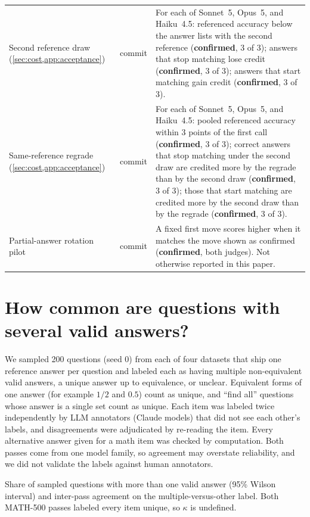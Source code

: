 {\begin{longtable}{L{3.2cm}L{1.1cm}L{8.7cm}}
Second reference draw (\cref{sec:cost,app:acceptance}) & commit & For each of Sonnet~5, Opus~5, and Haiku~4.5: referenced accuracy below the answer lists with the second reference (\textbf{confirmed}, 3 of 3); answers that stop matching lose credit (\textbf{confirmed}, 3 of 3); answers that start matching gain credit (\textbf{confirmed}, 3 of 3). \\
Same-reference regrade (\cref{sec:cost,app:acceptance}) & commit & For each of Sonnet~5, Opus~5, and Haiku~4.5: pooled referenced accuracy within 3 points of the first call (\textbf{confirmed}, 3 of 3); correct answers that stop matching under the second draw are credited more by the regrade than by the second draw (\textbf{confirmed}, 3 of 3); those that start matching are credited more by the second draw than by the regrade (\textbf{confirmed}, 3 of 3). \\
Partial-answer rotation pilot & commit & A fixed first move scores higher when it matches the move shown as confirmed (\textbf{confirmed}, both judges). Not otherwise reported in this paper. \\
\end{longtable}
}

\FloatBarrier
\section{How common are questions with several valid answers?}
\label{app:prevalence}

We sampled 200 questions (seed 0) from each of four datasets that ship one reference answer per question and labeled each as having multiple non-equivalent valid answers, a unique answer up to equivalence, or unclear. Equivalent forms of one answer (for example $1/2$ and $0.5$) count as unique, and ``find all'' questions whose answer is a single set count as unique. Each item was labeled twice independently by LLM annotators (Claude models) that did not see each other's labels, and disagreements were adjudicated by re-reading the item. Every alternative answer given for a math item was checked by computation. Both passes come from one model family, so agreement may overstate reliability, and we did not validate the labels against human annotators.

\begin{table}[htbp]
\centering
\caption{Share of sampled questions with more than one valid answer (95\% Wilson interval) and inter-pass agreement on the multiple-versus-other label. Both MATH-500 passes labeled every item unique, so $\kappa$ is undefined.\ph}
\label{tab:prevalence}
\footnotesize
\begin{adjustbox}{max width=\linewidth}\end{adjustbox}

\end{table}

